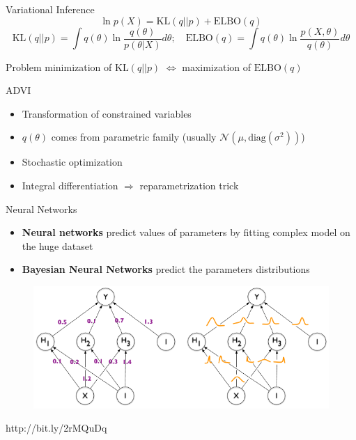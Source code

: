 \documentclass{beamer}
\begin{document}
\begin{frame}{Variational Inference}
	\[
		\ln p(X) = \text{KL}(q||p) + \text{ELBO}(q)
	\]
	\[
		\text{KL}(q||p) = \int q(\theta) \ln \frac{q(\theta)}{p(\theta|X)} d \theta;
	\quad
		\text{ELBO}(q) = \int q(\theta) \ln \frac{p(X, \theta)}{q(\theta)}d\theta
	\]
	\begin{block}{Problem}
		minimization of $\text{KL}(q||p)$ $\Leftrightarrow$ maximization of $\text{ELBO}(q)$ 
	\end{block}
	\begin{block}{ADVI}
	\begin{itemize}
		\item Transformation of constrained variables
		\item $q(\theta)$ comes from parametric family (usually $\mathcal{N}(\mu, \text{diag}(\sigma^2))$)
		\item Stochastic optimization
		\item Integral differentiation $\Rightarrow$ reparametrization trick
	\end{itemize}
	\end{block}
\end{frame}
\begin{frame}{Neural Networks}
	\begin{itemize}
	\item \textbf{Neural networks} predict values of parameters by fitting complex model on the huge dataset
	\item \textbf{Bayesian Neural Networks} predict the parameters distributions
	\end{itemize}
	\begin{figure}
		\includegraphics[width=1\linewidth]{pres_pics/BNN}
	\end{figure}
	
	\hrulefill
	
	\scriptsize{http://bit.ly/2rMQuDq}

\end{frame}
\end{document}
